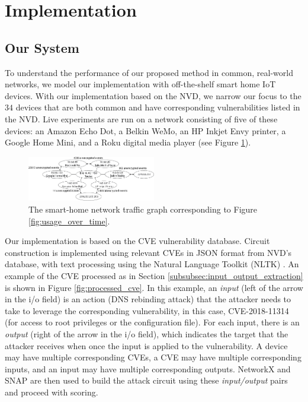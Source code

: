 \section{Implementation}
\label{sec:implementation}

\subsection{Our System}

To understand the performance of our proposed method in common, real-world networks, we model our implementation with off-the-shelf smart home IoT devices. With our implementation based on the NVD, we narrow our focus to the $34$ devices that are both common and have corresponding vulnerabilities listed in the NVD. Live experiments are run on a network consisting of five of these devices: an Amazon Echo Dot, a Belkin WeMo, an HP Inkjet Envy printer, a Google Home Mini, and a Roku digital media player (see Figure \ref{fig:smart_home_network}).

\begin{figure}[t]
    \centering
    \includegraphics[width=0.5\textwidth]{smart_home_network.png}
    \caption{The smart-home network traffic graph corresponding to Figure \ref{fig:usage_over_time}.}
    \label{fig:smart_home_network}
\end{figure}

Our implementation is based on the CVE vulnerability database. Circuit construction is implemented using relevant CVEs in JSON format from NVD's database, with text processing using the Natural Language Toolkit (NLTK) \cite{bird2004nltk}. An example of the CVE processed as in Section \ref{subsubsec:input_output_extraction} is shown in Figure \ref{fig:processed_cve}. In this example, an \textit{input} (left of the arrow in the i/o field) is an action (DNS rebinding attack) that the attacker needs to take to leverage the corresponding vulnerability, in this case, CVE-2018-11314 (for access to root privileges or the configuration file). For each input, there is an \textit{output} (right of the arrow in the i/o field), which indicates the target that the attacker receives when once the input is applied to the vulnerability. A device may have multiple corresponding CVEs, a CVE may have multiple corresponding inputs, and an input may have multiple corresponding outputs. NetworkX \cite{hagberg2008exploring} and SNAP \cite{leskovec2016snap} are then used to build the attack circuit using these \textit{input/output} pairs and proceed with scoring.

